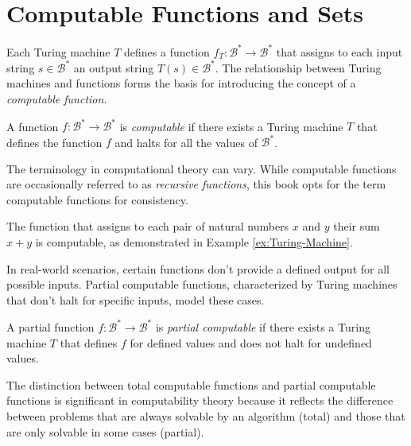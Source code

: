 %
%

\section{Computable Functions and Sets}
\label{sec:computable_functions}

Each Turing machine \(T\) defines a function \(f_T:\mathcal{B}^{\ast} \rightarrow \mathcal{B}^{\ast}\) that assigns to each input string \(s \in \mathcal{B}^{\ast}\) an output string \(T(s) \in \mathcal{B}^{\ast}\). The relationship between Turing machines and functions forms the basis for introducing the concept of a \emph{computable function}.

\begin{definition}
\label{def:computable-function}
A function \(f: \mathcal{B}^{\ast} \rightarrow \mathcal{B}^{\ast}\) is \emph{computable} if there exists a Turing machine \(T\) that defines the function \(f\) and halts for all the values of \( \mathcal{B}^{\ast} \).
\end{definition}

The terminology in computational theory can vary. While computable functions are occasionally referred to as \emph{recursive functions}, this book opts for the term computable functions for consistency.

\begin{example}
The function that assigns to each pair of natural numbers \(x\) and \(y\) their sum \(x + y\) is computable, as demonstrated in Example \ref{ex:Turing-Machine}. 
\end{example}

In real-world scenarios, certain functions don’t provide a defined output for all possible inputs. Partial computable functions, characterized by Turing machines that don’t halt for specific inputs, model these cases.

\begin{definition}
A partial function \(f:\mathcal{B}^{\ast} \rightarrow \mathcal{B}^{\ast}\) is \emph{partial computable} if there exists a Turing machine \(T\) that defines \(f\) for defined values and does not halt for undefined values.
\end{definition}

The distinction between total computable functions and partial computable functions is significant in computability theory because it reflects the difference between problems that are always solvable by an algorithm (total) and those that are only solvable in some cases (partial).

